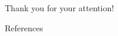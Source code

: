 \documentclass[10pt]{beamer}
\begin{document}
{

\begin{frame}[standout]

Thank you for your attention!

\end{frame}

}


\appendix


\begin{frame}[allowframebreaks]{References}


% 

% 

\printbibliography


\end{frame}
\end{document}
